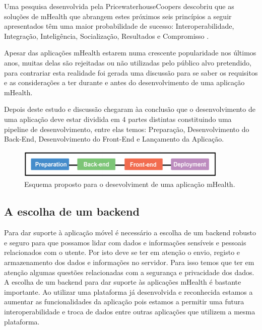 Uma pesquisa desenvolvida pela PricewaterhouseCoopers descobriu que as solu\c c\~oes de mHealth que abrangem estes pr\'oximos seis princ\'ipios a seguir apresentados t\^em uma maior probabilidade de sucesso: Interoperabilidade, Integra\c c\~ao, Intelig\^encia, Socializa\c c\~ao, Resultados e Compromisso \cite{mhealthinsights}.
\par
Apesar das aplica\c c\~oes mHealth estarem numa crescente popularidade nos \'ultimos anos, muitas delas s\~ao rejeitadas ou n\~ao utilizadas pelo p\'ublico alvo pretendido, para contrariar esta realidade foi gerada uma discuss\~ao para se saber os requisitos e as considera\c c\~oes a ter durante e antes do desenvolvimento de uma aplica\c c\~ao mHealth.
\par
Depois deste estudo e discuss\~ao chegaram \`aa conclus\~ao que o desenvolvimento de uma aplica\c c\~ao deve estar dividida em 4 partes distintas constituindo uma pipeline de desenvolvimento, entre elas temos:  Prepara\c c\~ao, Desenvolvimento do Back-End, Desenvolvimento do Front-End e Lan\c camento da Aplica\c c\~ao\cite{mhealth-pipeline}.

\begin{figure}[!ht]
  \centering
  \includegraphics[width=0.9\textwidth]{imgs/mhealthDevPipeline.png}
  \caption[Esquema proposto para o desevolvimento de uma aplica\c c\~ao mHealth]{Esquema proposto para o desevolviment de uma aplica\c c\~ao mHealth. \cite{mhealth-pipeline}}
  
  \label{f:mhealthpipeline}
\end{figure}

\subsection{A escolha de um backend}

Para dar suporte à aplicação móvel é necessário a escolha de um backend robusto e seguro para que possamos lidar com dados e informações sensíveis e pessoais relacionados com o utente. Por isto deve se ter em atenção o envio, registo e armazenamento dos dados e informações no servidor. Para isso temos que ter em atenção algumas questões relacionadas com a segurança e privacidade dos dados. A escolha de um backend para dar suporte às aplicações mHealth é bastante importante. Ao utilizar uma plataforma já desenvolvida e reconhecida estamos a aumentar as funcionalidades da aplicação pois estamos a permitir uma futura interoperabilidade e troca de dados entre outras aplicações que utilizem a mesma plataforma.


